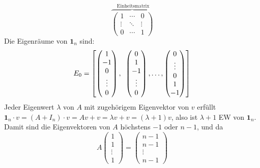 \begin{solution}
\begin{enumerate}[label= (\alph*)]
\begin{equation*}
      \overbrace{\begin{pmatrix}
        1 & \cdots & 0 \\
        \vdots & \ddots & \vdots \\
        0 & \cdots & 1
      \end{pmatrix}}^\text{ Einheitsmatrix}
    \end{equation*}
    Die Eigenräume von \( \textbf{1}_n \) sind:
    \begin{equation*}
      E_0 = \left[\begin{pmatrix}
        1 \\ -1 \\ 0 \\ \vdots \\ 0
      \end{pmatrix},\enskip
      \begin{pmatrix}
        0 \\ 1 \\ -1 \\ \vdots \\ 0
      \end{pmatrix},\dots,
      \begin{pmatrix}
        0 \\ \vdots \\ 0 \\ 1 \\ -1
      \end{pmatrix} 
      \right]
    \end{equation*} 
    Jeder Eigenwert \( \lambda \) von \( A \) mit zugehörigem Eigenvektor von \( v \) erfüllt \\
    \( \textbf{1}_n \cdot v = (A + I_n) \cdot v = Av + v = \lambda v + v = (\lambda + 1)v \), also ist \( \lambda +1 \) EW von \( \textbf{1}_n \). \\
    Damit sind die Eigenvektoren von \( A \) höchstens \( -1 \) oder \( n-1 \), und da 
    \begin{equation*}
      A \begin{pmatrix}
        1 \\ 1 \\ \vdots \\ 1
      \end{pmatrix} = 
      \begin{pmatrix}
        n-1 \\ n-1 \\ \vdots \\ n-1
      \end{pmatrix}
    \end{equation*}

\end{enumerate}
\end{solution}

